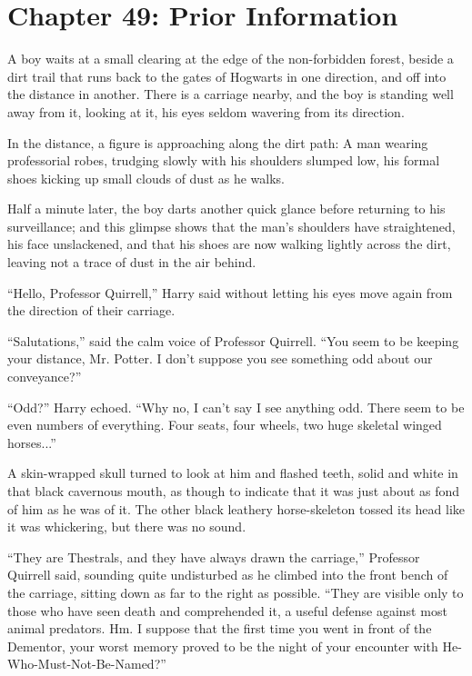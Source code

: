 \chapter{Chapter 49: Prior Information}
A boy waits at a small clearing at the edge of the non-forbidden forest, beside a dirt trail that runs back to the gates of Hogwarts in one direction, and off into the distance in another. There is a carriage nearby, and the boy is standing well away from it, looking at it, his eyes seldom wavering from its direction.

In the distance, a figure is approaching along the dirt path: A man wearing professorial robes, trudging slowly with his shoulders slumped low, his formal shoes kicking up small clouds of dust as he walks.

Half a minute later, the boy darts another quick glance before returning to his surveillance; and this glimpse shows that the man's shoulders have straightened, his face unslackened, and that his shoes are now walking lightly across the dirt, leaving not a trace of dust in the air behind.

``Hello, Professor Quirrell,'' Harry said without letting his eyes move again from the direction of their carriage.

``Salutations,'' said the calm voice of Professor Quirrell. ``You seem to be keeping your distance, Mr. Potter. I don't suppose you see something odd about our conveyance?''

``Odd?'' Harry echoed. ``Why no, I can't say I see anything odd. There seem to be even numbers of everything. Four seats, four wheels, two huge skeletal winged horses...''

A skin-wrapped skull turned to look at him and flashed teeth, solid and white in that black cavernous mouth, as though to indicate that it was just about as fond of him as he was of it. The other black leathery horse-skeleton tossed its head like it was whickering, but there was no sound.

``They are Thestrals, and they have always drawn the carriage,'' Professor Quirrell said, sounding quite undisturbed as he climbed into the front bench of the carriage, sitting down as far to the right as possible. ``They are visible only to those who have seen death and comprehended it, a useful defense against most animal predators. Hm. I suppose that the first time you went in front of the Dementor, your worst memory proved to be the night of your encounter with He-Who-Must-Not-Be-Named?''

